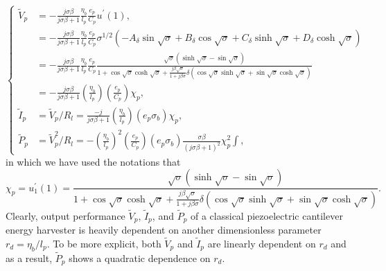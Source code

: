 \documentclass{article}
\begin{document}
\begin{equation}
    \left\{\begin{aligned}
        \tilde{V}_p &= -\frac{j \sigma \beta}{j \sigma \beta + 1} \frac{\eta_b}{l_p} \frac{e_p}{C_p} u^\prime(1), \\
        &= -\frac{j \sigma \beta}{j \sigma \beta + 1} \frac{\eta_b}{l_p} \frac{e_p}{C_p} \sigma^{1/2} \left( - A_\delta \sin{\sqrt{\sigma}} + B_\delta \cos{\sqrt{\sigma}} + C_\delta \sinh{\sqrt{\sigma}} + D_\delta \cosh{\sqrt{\sigma}} \right) \\
        &= - \frac{j \sigma \beta}{j \sigma \beta + 1} \frac{\eta_b}{l_p} \frac{e_p}{C_p}  \frac{ \sqrt{\sigma} \left( \sinh\sqrt{\sigma} - \sin\sqrt{\sigma} \right) }{ 1 + \cos\sqrt{\sigma } \cosh\sqrt{\sigma } + \frac{j \beta \sqrt{\sigma}}{ 1+ j \beta \sigma } \delta \left( \cos\sqrt{\sigma } \sinh\sqrt{\sigma } + \sin\sqrt{\sigma } \cosh\sqrt{\sigma } \right) }\\
        &= - \frac{j \sigma \beta}{j \sigma \beta + 1} \left(\frac{\eta_b}{l_p}\right) \left(\frac{e_p}{C_p}\right) \chi_p , \\
        \tilde{I}_p &=  \tilde{V}_p / R_l = \frac{ - j } {j \sigma \beta + 1} \left(\frac{\eta_b}{l_p}\right) \left(e_p \sigma_b\right) \chi_p , \\
        \tilde{P}_p &=  \tilde{V}_p^2 / R_l = - \left(\frac{\eta_b}{l_p}\right)^2 \left(\frac{e_p}{C_p}\right) \left(e_p \sigma_b\right) \frac{ \sigma \beta}{\left( j \sigma \beta + 1 \right)^2}  \chi_p^2∫,
    \end{aligned}\right.
    \label{eq:eq_peh_perfs_compact_form}
\end{equation}
in which we have used the notations that 
\begin{equation}
    \chi_p = u_1^\prime(1) = \frac{ \sqrt{\sigma} \left( \sinh\sqrt{\sigma} - \sin\sqrt{\sigma} \right) }{ 1 + \cos\sqrt{\sigma } \cosh\sqrt{\sigma } + \frac{j \beta \sqrt{\sigma}}{ 1+ j \beta \sigma } \delta \left( \cos\sqrt{\sigma } \sinh\sqrt{\sigma } + \sin\sqrt{\sigma } \cosh\sqrt{\sigma } \right) }.
\end{equation}
Clearly, output performance $\tilde{V}_p$, $\tilde{I}_p$, and $\tilde{P}_p$ of a classical piezoelectric cantilever energy harvester is heavily dependent on another dimensionless parameter $r_d = \eta_b/l_p$. To be more explicit, both $\tilde{V}_p$ and $\tilde{I}_p$ are linearly dependent on $r_d$ and as a result, $\tilde{P}_p$ shows a quadratic dependence on $r_d$.
\end{document}

